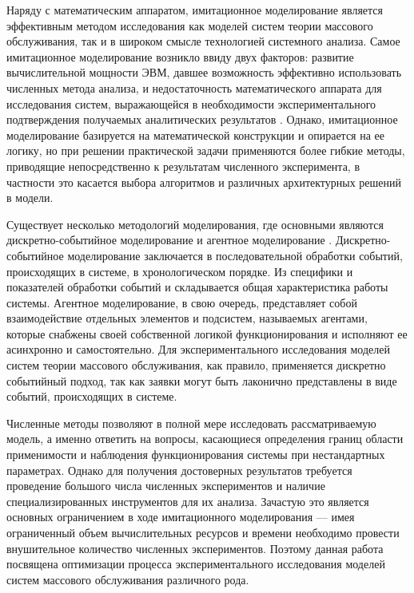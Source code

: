 Наряду с математическим аппаратом, имитационное моделирование \cite{задорожный2011методы} является эффективным методом исследования как моделей систем теории массового обслуживания, так и в широком смысле технологией системного анализа. Самое имитационное моделирование возникло ввиду двух факторов: развитие вычислительной мощности ЭВМ, давшее возможность эффективно использовать численных метода анализа, и недостаточность математического аппарата для исследования систем, выражающейся в необходимости экспериментального подтверждения получаемых аналитических результатов \cite{горбунов2007парадигмы}. Однако, имитационное моделирование базируется на математической конструкции и опирается на ее логику, но при решении практической задачи применяются более гибкие методы, приводящие непосредственно к результатам численного эксперимента, в частности это касается выбора алгоритмов и различных архитектурных решений в модели.

Существует несколько методологий моделирования, где основными являются дискретно-событийное моделирование \cite{илюхина2015дискретно,григорьева2014дискретно} и агентное моделирование \cite{лебедюк2017агентное}. Дискретно-событийное моделирование заключается в последовательной обработки событий, происходящих в системе, в хронологическом порядке. Из специфики и показателей обработки событий и складывается общая характеристика работы системы. Агентное моделирование, в свою очередь, представляет собой взаимодействие отдельных элементов и подсистем, называемых агентами, которые снабжены своей собственной логикой функционирования и исполняют ее асинхронно и самостоятельно. Для экспериментального исследования моделей систем теории массового обслуживания, как правило, применяется дискретно событийный подход, так как заявки могут быть лаконично представлены в виде событий, происходящих в системе.

 Численные методы позволяют в полной мере исследовать рассматриваемую модель, а именно ответить на вопросы, касающиеся определения границ области применимости и наблюдения функционирования системы при нестандартных параметрах. Однако для получения достоверных результатов требуется проведение большого числа численных экспериментов и наличие специализированных инструментов для их анализа. Зачастую это является основных ограничением в ходе имитационного моделирования --- имея ограниченный объем вычислительных ресурсов и времени необходимо провести внушительное количество численных экспериментов. Поэтому данная работа посвящена оптимизации процесса экспериментального исследования моделей систем массового обслуживания различного рода. 
 
